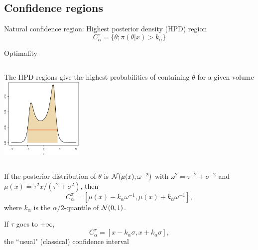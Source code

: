 \subsection{Confidence regions}\begin{slide}

Natural confidence region: Highest posterior density (HPD) region
$$
C_\alpha^\pi =  \lbrace \theta;\pi(\theta |x)>k_\alpha\rbrace
$$

\pause
\begin{block}{Optimality}
\begin{columns}
The HPD regions give the highest probabilities of containing $\theta$ for a given volume
\includegraphics[width=4cm,height=4truecm]{figures/2cau}
\end{columns}
\end{block}

\end{slide}\begin{slide}
\debut If the posterior distribution of $\theta$ is 
${\cal N}(\mu(x),\allowbreak\omega^{-2})$ with $\omega^2=\tau^{-2}+\sigma^{-2}$ and 
$\mu(x)= \tau^2 x/(\tau^2+\sigma^2)$,
then
$$
C^\pi_\alpha  =  \left[\mu(x)-k_{\alpha} \omega^{-1}, \mu(x)+k_{\alpha} 
\omega^{ -1} \right],
$$
where $ k_\alpha $ is the $\alpha/2$-quantile of ${\cal N}(0,1)$. 

\pause
If $\tau$ goes to $+\infty$,
$$
C_\alpha^\pi =\left[x-k_{\alpha} \sigma , x+k_{\alpha} \sigma \right] ,
$$
the ``usual" (classical) confidence interval
\fin

\end{slide}
